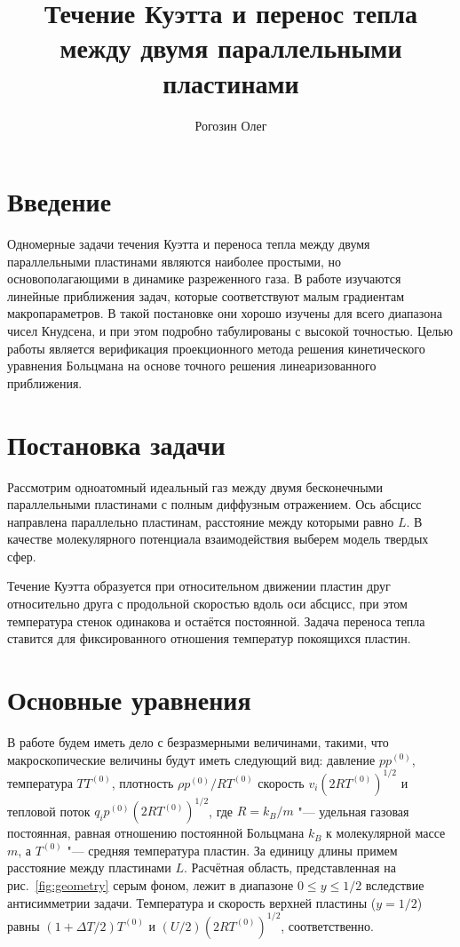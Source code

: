 \documentclass[a4paper,12pt]{article}
\title{Течение Куэтта и перенос тепла между двумя параллельными пластинами}
\author{Рогозин Олег}
\begin{document}
\maketitle
\tableofcontents

\section{Введение}

Одномерные задачи течения Куэтта и переноса тепла между двумя параллельными пластинами являются наиболее простыми,
но основополагающими в динамике разреженного газа. В работе изучаются линейные приближения задач,
которые соответствуют малым градиентам макропараметров. В такой постановке они хорошо изучены
для всего диапазона чисел Кнудсена, и при этом подробно табулированы с высокой точностью.
Целью работы является верификация проекционного метода решения кинетического уравнения Больцмана
на основе точного решения линеаризованного приближения.

\section{Постановка задачи}

Рассмотрим одноатомный идеальный газ между двумя бесконечными параллельными пластинами с полным диффузным отражением.
Ось абсцисс направлена параллельно пластинам, расстояние между которыми равно \(L\).
В качестве молекулярного потенциала взаимодействия выберем модель твердых сфер.

Течение Куэтта образуется при относительном движении пластин друг относительно друга с продольной скоростью
вдоль оси абсцисс, при этом температура стенок одинакова и остаётся постоянной.
Задача переноса тепла ставится для фиксированного отношения температур покоящихся пластин.

\section{Основные уравнения}

В работе будем иметь дело с безразмерными величинами, такими, что макроскопические величины будут
иметь следующий вид: давление \(pp^{(0)}\), температура \(TT^{(0)}\), плотность \(\rho p^{(0)}/RT^{(0)}\)
скорость \(v_i(2RT^{(0)})^{1/2}\) и тепловой поток \(q_ip^{(0)}(2RT^{(0)})^{1/2}\),
где \(R = k_B/m\) "--- удельная газовая постоянная,
равная отношению постоянной Больцмана \(k_B\) к молекулярной массе \(m\),
а \(T^{(0)}\) "--- средняя температура пластин.
За единицу длины примем расстояние между пластинами \(L\).
Расчётная область, представленная на рис.~\ref{fig:geometry} серым фоном,
лежит в диапазоне \(0 \le y\le 1/2\) вследствие антисимметрии задачи.
Температура и скорость верхней пластины (\(y=1/2\)) равны \((1+\Delta T/2)T^{(0)}\)
и \((U/2)(2RT^{(0)})^{1/2}\), соответственно.
\end{document}
